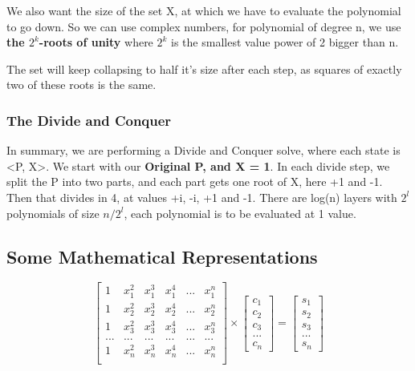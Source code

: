 We also want the size of the set X, at which we have to evaluate the polynomial to go down. So we can use complex numbers, for polynomial of degree n, we use \textbf{the $2^k$-roots of unity} where $2^k$ is the smallest value power of 2 bigger than n.

The set will keep collapsing to half it's size after each step, as squares of exactly two of these roots is the same.

\subsubsection{The Divide and Conquer}
In summary, we are performing a Divide and Conquer solve, where each state is <P, X>.
We start with our \textbf{Original P, and X = 1}. In each divide step, we split the P into two parts, and each part gets one root of X, here +1 and -1. Then that divides in 4, at values +i, -i, +1 and -1. There are log(n) layers with $2^l$ polynomials of size $n/2^l$, each polynomial is to be evaluated at 1 value.


\subsection{Some Mathematical Representations}

\begin{equation}
  \begin{bmatrix}
    1   & x_1^2 & x_1^3 & x_1^4 & ... & x_1^n \\
    1   & x_2^2 & x_2^3 & x_2^4 & ... & x_2^n \\
    1   & x_3^2 & x_3^3 & x_3^4 & ... & x_3^n \\
    ... & ...   & ...   & ...   & ... & ...   \\
    1   & x_n^2 & x_n^3 & x_n^4 & ... & x_n^n \\
  \end{bmatrix} \times
  \begin{bmatrix}
    c_1 \\ c_2 \\ c_3 \\ ... \\ c_n
  \end{bmatrix} =
  \begin{bmatrix}
    s_1 \\ s_2 \\ s_3 \\ ... \\ s_n
  \end{bmatrix}
\end{equation}

